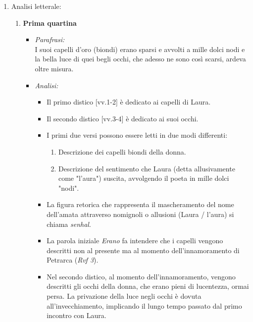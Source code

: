 \documentclass{article}
\begin{document}
\begin{enumerate}
    \item Analisi letterale:
        \begin{enumerate}[label=]
            \item \textbf{Prima quartina}
                \begin{itemize}[label=]
                    \item \textit{Parafrasi:}\\
                        I suoi capelli d'oro (biondi) erano sparsi e avvolti a mille dolci nodi e la bella luce di quei begli occhi, che adesso ne sono così scarsi, ardeva oltre misura.
                    \item \textit{Analisi:}
                        \begin{itemize}
                            \item Il primo distico [vv.1-2] è dedicato ai capelli di Laura.
                            \item Il secondo distico [vv.3-4] è dedicato ai suoi occhi.
                            \item I primi due versi possono essere letti in due modi differenti:
                                \begin{enumerate}
                                    \item Descrizione dei capelli biondi della donna.
                                    \item Descrizione del sentimento che Laura (detta allusivamente come "l'aura") suscita, avvolgendo il poeta in mille dolci "nodi".
                                \end{enumerate}
                            \item La figura retorica che rappresenta il mascheramento del nome dell'amata attraverso nomignoli o allusioni (Laura / l'aura) si chiama \textit{senhal}.
                            \item La parola iniziale \textit{Erano} fa intendere che i capelli vengono descritti non al presente ma al momento dell'innamoramento di Petrarca (\textit{Rvf 3}).
                            \item Nel secondo distico, al momento dell'innamoramento, vengono descritti gli occhi della donna, che erano pieni di lucentezza, ormai persa. La privazione della luce negli occhi è dovuta all'invecchiamento, implicando il lungo tempo passato dal primo incontro con Laura.
                        \end{itemize}
                \end{itemize}

\end{enumerate}
\end{enumerate}
\end{document}
